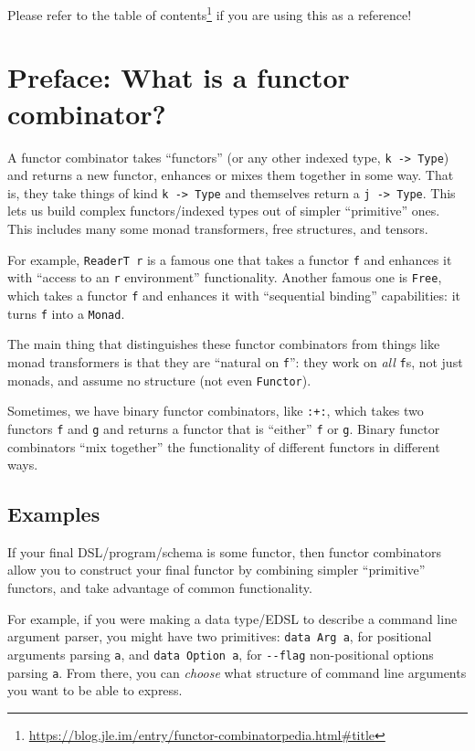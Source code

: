 \documentclass[]{article}
\renewcommand{\href}[2]{#2\footnote{\url{#1}}}
\begin{document}
Please refer to the
\href{https://blog.jle.im/entry/functor-combinatorpedia.html\#title}{table of
contents} if you are using this as a reference!

\section{Preface: What is a functor
combinator?}\label{preface-what-is-a-functor-combinator}

A functor combinator takes ``functors'' (or any other indexed type,
\texttt{k\ -\textgreater{}\ Type}) and returns a new functor, enhances or mixes
them together in some way. That is, they take things of kind
\texttt{k\ -\textgreater{}\ Type} and themselves return a
\texttt{j\ -\textgreater{}\ Type}. This lets us build complex functors/indexed
types out of simpler ``primitive'' ones. This includes many some monad
transformers, free structures, and tensors.

For example, \texttt{ReaderT\ r} is a famous one that takes a functor \texttt{f}
and enhances it with ``access to an \texttt{r} environment'' functionality.
Another famous one is \texttt{Free}, which takes a functor \texttt{f} and
enhances it with ``sequential binding'' capabilities: it turns \texttt{f} into a
\texttt{Monad}.

The main thing that distinguishes these functor combinators from things like
monad transformers is that they are ``natural on \texttt{f}'': they work on
\emph{all} \texttt{f}s, not just monads, and assume no structure (not even
\texttt{Functor}).

Sometimes, we have binary functor combinators, like \texttt{:+:}, which takes
two functors \texttt{f} and \texttt{g} and returns a functor that is ``either''
\texttt{f} or \texttt{g}. Binary functor combinators ``mix together'' the
functionality of different functors in different ways.

\subsection{Examples}\label{examples}

If your final DSL/program/schema is some functor, then functor combinators allow
you to construct your final functor by combining simpler ``primitive'' functors,
and take advantage of common functionality.

For example, if you were making a data type/EDSL to describe a command line
argument parser, you might have two primitives: \texttt{data\ Arg\ a}, for
positional arguments parsing \texttt{a}, and \texttt{data\ Option\ a}, for
\texttt{-\/-flag} non-positional options parsing \texttt{a}. From there, you can
\emph{choose} what structure of command line arguments you want to be able to
express.
\end{document}
